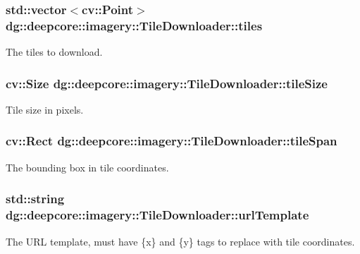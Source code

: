 \subsubsection[{\texorpdfstring{tiles}{tiles}}]{\setlength{\rightskip}{0pt plus 5cm}std\+::vector$<$cv\+::\+Point$>$ dg\+::deepcore\+::imagery\+::\+Tile\+Downloader\+::tiles}\hypertarget{structdg_1_1deepcore_1_1imagery_1_1_tile_downloader_a213ae477313131ed92dab6df96354a94}{}\label{structdg_1_1deepcore_1_1imagery_1_1_tile_downloader_a213ae477313131ed92dab6df96354a94}


The tiles to download. 

\subsubsection[{\texorpdfstring{tile\+Size}{tileSize}}]{\setlength{\rightskip}{0pt plus 5cm}cv\+::\+Size dg\+::deepcore\+::imagery\+::\+Tile\+Downloader\+::tile\+Size}\hypertarget{structdg_1_1deepcore_1_1imagery_1_1_tile_downloader_a393833b2aa8a3a134ca6aac438802ece}{}\label{structdg_1_1deepcore_1_1imagery_1_1_tile_downloader_a393833b2aa8a3a134ca6aac438802ece}


Tile size in pixels. 

\subsubsection[{\texorpdfstring{tile\+Span}{tileSpan}}]{\setlength{\rightskip}{0pt plus 5cm}cv\+::\+Rect dg\+::deepcore\+::imagery\+::\+Tile\+Downloader\+::tile\+Span}\hypertarget{structdg_1_1deepcore_1_1imagery_1_1_tile_downloader_a09a8dbd06565015c875284ab6618e7d7}{}\label{structdg_1_1deepcore_1_1imagery_1_1_tile_downloader_a09a8dbd06565015c875284ab6618e7d7}


The bounding box in tile coordinates. 

\subsubsection[{\texorpdfstring{url\+Template}{urlTemplate}}]{\setlength{\rightskip}{0pt plus 5cm}std\+::string dg\+::deepcore\+::imagery\+::\+Tile\+Downloader\+::url\+Template}\hypertarget{structdg_1_1deepcore_1_1imagery_1_1_tile_downloader_ac8fb59cb29683585c7f868e6d8a70f6f}{}\label{structdg_1_1deepcore_1_1imagery_1_1_tile_downloader_ac8fb59cb29683585c7f868e6d8a70f6f}


The U\+RL template, must have \{x\} and \{y\} tags to replace with tile coordinates. 

